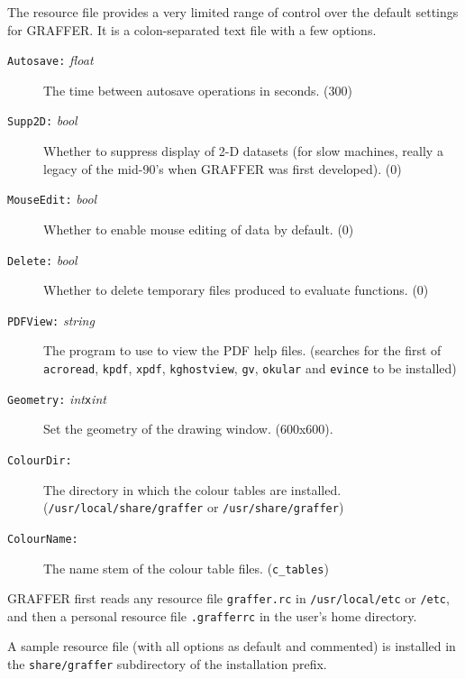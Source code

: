 \documentclass[11pt,twoside,english]{article}
\begin{document}
The resource file provides a very limited range of control
over the default settings for GRAFFER. It is a colon-separated text
file with a few options.
\begin{description}
\item[\texttt{Autosave:} \textit{float}] The time between autosave
  operations in seconds. (300)
\item[\texttt{Supp2D:} \textit{bool}] Whether to suppress display of
  2-D datasets (for slow machines, really a legacy of the
  mid-90's when GRAFFER was first developed). (0)
\item[\texttt{MouseEdit:} \textit{bool}] Whether to enable mouse
  editing of data by default. (0)
\item[\texttt{Delete:} \textit{bool}] Whether to delete temporary files
  produced to evaluate functions. (0)
\item[\texttt{PDFView:} \textit{string}] The program to use to view the
  PDF help files. (searches for the first of \texttt{acroread},
  \texttt{kpdf}, \texttt{xpdf}, \texttt{kghostview}, \texttt{gv},
  \texttt{okular} and \texttt{evince} to be installed)
\item[\texttt{Geometry:} \textit{int}\texttt{x}\textit{int}] Set the
  geometry of the drawing window. (600x600).
\item[\texttt{ColourDir:}] The directory in which the colour tables are
  installed. (\texttt{/usr/local/share/graffer} or
  \texttt{/usr/share/graffer})
\item[\texttt{ColourName:}] The name stem of the colour table
  files. (\texttt{c\_tables})
\end{description}

GRAFFER first reads any resource file \texttt{graffer.rc} in
\texttt{/usr/local/etc} or \texttt{/etc}, and then a personal resource
file \texttt{.grafferrc} in the user's home directory.

A sample resource file (with all options as default and commented) is
installed in the \texttt{share/graffer} subdirectory of the
installation prefix.
\end{document}
